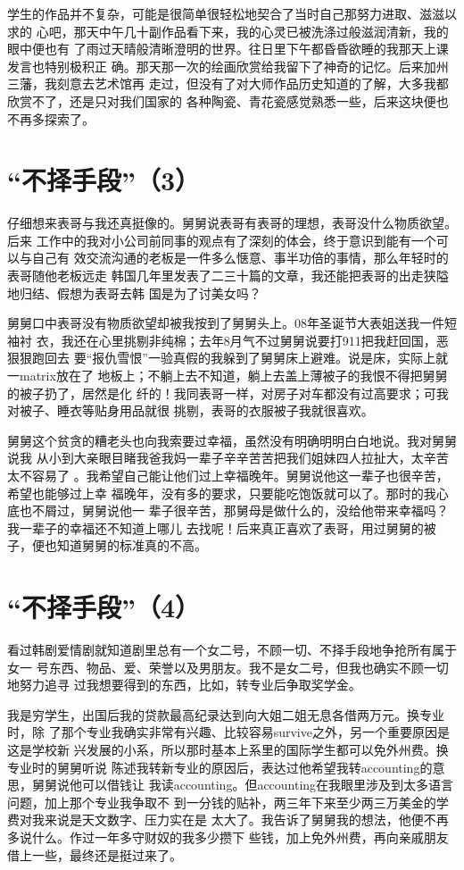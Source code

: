 \documentclass[12pt]{book}
\begin{document}
学生的作品并不复杂，可能是很简单很轻松地契合了当时自己那努力进取、滋滋以求的
心吧，那天中午几十副作品看下来，我的心灵已被洗涤过般滋润清新，我的眼中便也有
了雨过天晴般清晰澄明的世界。往日里下午都昏昏欲睡的我那天上课发言也特别极积正
确。那天那一次的绘画欣赏给我留下了神奇的记忆。后来加州三藩，我刻意去艺术馆再
走过，但没有了对大师作品历史知道的了解，大多我都欣赏不了，还是只对我们国家的
各种陶瓷、青花瓷感觉熟悉一些，后来这块便也不再多探索了。
\section{“不择手段”（3）}
\label{sec-9-89}

仔细想来表哥与我还真挺像的。舅舅说表哥有表哥的理想，表哥没什么物质欲望。后来
工作中的我对小公司前同事的观点有了深刻的体会，终于意识到能有一个可以与自己有
效交流沟通的老板是一件多么惬意、事半功倍的事情，那么年轻时的表哥随他老板远走
韩国几年里发表了二三十篇的文章，我还能把表哥的出走狭隘地归结、假想为表哥去韩
国是为了讨美女吗？

舅舅口中表哥没有物质欲望却被我按到了舅舅头上。08年圣诞节大表姐送我一件短袖衬
衣，我还在心里挑剔非纯棉；去年8月气不过舅舅说要打911把我赶回国，恶狠狠跑回去
要“报仇雪恨”一验真假的我躲到了舅舅床上避难。说是床，实际上就一matrix放在了
地板上；不躺上去不知道，躺上去盖上薄被子的我恨不得把舅舅的被子扔了，居然是化
纤的！我同表哥一样，对房子对车都没有过高要求；可我对被子、睡衣等贴身用品就很
挑剔，表哥的衣服被子我就很喜欢。

舅舅这个贫贪的糟老头也向我索要过幸福，虽然没有明确明明白白地说。我对舅舅说我
从小到大亲眼目睹我爸我妈一辈子辛辛苦苦把我们姐妹四人拉扯大，太辛苦太不容易了
。我希望自己能让他们过上幸福晚年。舅舅说他这一辈子也很辛苦，希望也能够过上幸
福晚年，没有多的要求，只要能吃饱饭就可以了。那时的我心底也不屑过，舅舅说他一
辈子很辛苦，那舅母是做什么的，没给他带来幸福吗？我一辈子的幸福还不知道上哪儿
去找呢！后来真正喜欢了表哥，用过舅舅的被子，便也知道舅舅的标准真的不高。
\section{“不择手段”（4）}
\label{sec-9-90}

看过韩剧爱情剧就知道剧里总有一个女二号，不顾一切、不择手段地争抢所有属于女一
号东西、物品、爱、荣誉以及男朋友。我不是女二号，但我也确实不顾一切地努力追寻
过我想要得到的东西，比如，转专业后争取奖学金。

我是穷学生，出国后我的贷款最高纪录达到向大姐二姐无息各借两万元。换专业时，除
了那个专业我确实非常有兴趣、比较容易survive之外，另一个重要原因是这是学校新
兴发展的小系，所以那时基本上系里的国际学生都可以免外州费。换专业时的舅舅听说
陈述我转新专业的原因后，表达过他希望我转accounting的意思，舅舅说他可以借钱让
我读accounting。但accounting在我眼里涉及到太多语言问题，加上那个专业我争取不
到一分钱的贴补，两三年下来至少两三万美金的学费对我来说是天文数字、压力实在是
太大了。我告诉了舅舅我的想法，他便不再多说什么。作过一年多守财奴的我多少攒下
些钱，加上免外州费，再向亲戚朋友借上一些，最终还是挺过来了。
\end{document}

